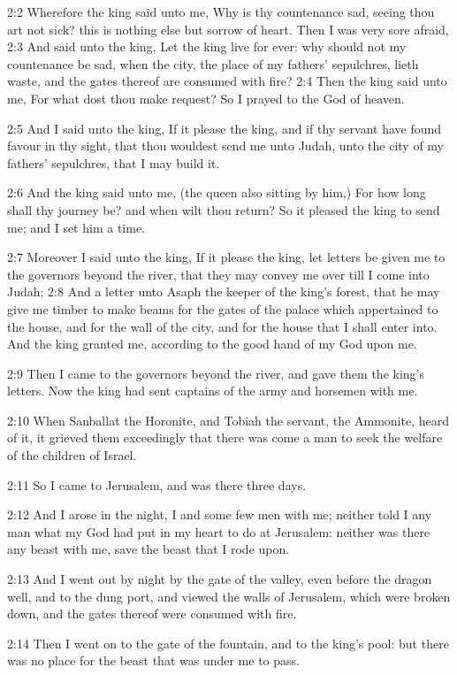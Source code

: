 2:2 Wherefore the king said unto me, Why is thy countenance sad, seeing thou art not sick? this is nothing else but sorrow of heart.  Then I was very sore afraid, 2:3 And said unto the king, Let the king live for ever: why should not my countenance be sad, when the city, the place of my fathers' sepulchres, lieth waste, and the gates thereof are consumed with fire?  2:4 Then the king said unto me, For what dost thou make request? So I prayed to the God of heaven.

2:5 And I said unto the king, If it please the king, and if thy servant have found favour in thy sight, that thou wouldest send me unto Judah, unto the city of my fathers' sepulchres, that I may build it.

2:6 And the king said unto me, (the queen also sitting by him,) For how long shall thy journey be? and when wilt thou return? So it pleased the king to send me; and I set him a time.

2:7 Moreover I said unto the king, If it please the king, let letters be given me to the governors beyond the river, that they may convey me over till I come into Judah; 2:8 And a letter unto Asaph the keeper of the king's forest, that he may give me timber to make beams for the gates of the palace which appertained to the house, and for the wall of the city, and for the house that I shall enter into. And the king granted me, according to the good hand of my God upon me.

2:9 Then I came to the governors beyond the river, and gave them the king's letters. Now the king had sent captains of the army and horsemen with me.

2:10 When Sanballat the Horonite, and Tobiah the servant, the Ammonite, heard of it, it grieved them exceedingly that there was come a man to seek the welfare of the children of Israel.

2:11 So I came to Jerusalem, and was there three days.

2:12 And I arose in the night, I and some few men with me; neither told I any man what my God had put in my heart to do at Jerusalem: neither was there any beast with me, save the beast that I rode upon.

2:13 And I went out by night by the gate of the valley, even before the dragon well, and to the dung port, and viewed the walls of Jerusalem, which were broken down, and the gates thereof were consumed with fire.

2:14 Then I went on to the gate of the fountain, and to the king's pool: but there was no place for the beast that was under me to pass.


